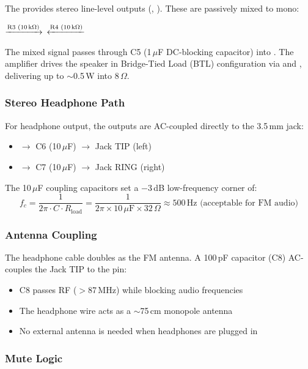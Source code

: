 The  provides stereo line-level outputs (, ).
These are passively mixed to mono:
%
\begin{center}
\small
{} $\xrightarrow{\text{R3 (10\,k}\Omega\text{)}}$
$\xleftarrow{\text{R4 (10\,k}\Omega\text{)}}$ 
\end{center}
%
The mixed signal passes through C5 (1\,$\mu$F DC-blocking capacitor) into
 .  The amplifier drives the speaker in Bridge-Tied Load
(BTL) configuration via  and , delivering up to
$\sim$0.5\,W into 8\,$\Omega$.

\subsubsection{Stereo Headphone Path}

For headphone output, the  outputs are AC-coupled directly to
the 3.5\,mm jack:
%
\begin{itemize}[leftmargin=1.8em, itemsep=2pt]
  \item {} $\to$ C6 (10\,$\mu$F) $\to$ Jack TIP (left)
  \item {} $\to$ C7 (10\,$\mu$F) $\to$ Jack RING (right)
\end{itemize}
%
The 10\,$\mu$F coupling capacitors set a $-$3\,dB low-frequency corner of:
%
\[
  f_c = \frac{1}{2\pi \cdot C \cdot R_{\text{load}}}
      = \frac{1}{2\pi \times 10\,\mu\text{F} \times 32\,\Omega}
      \approx 500\,\text{Hz (acceptable for FM audio)}
\]

\subsubsection{Antenna Coupling}

The headphone cable doubles as the FM antenna.  A 100\,pF capacitor (C8)
AC-couples the Jack TIP to the   pin:
%
\begin{itemize}[leftmargin=1.8em, itemsep=2pt]
  \item C8 passes RF ($>$87\,MHz) while blocking audio frequencies
  \item The headphone wire acts as a $\sim$75\,cm monopole antenna
  \item No external antenna is needed when headphones are plugged in
\end{itemize}

\subsubsection{Mute Logic}

